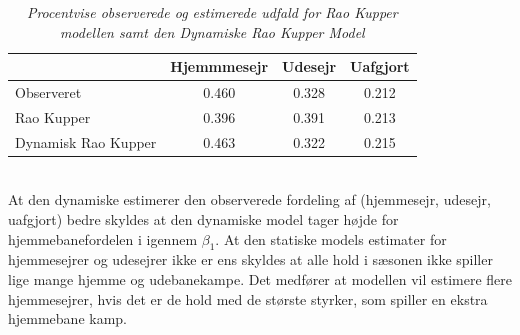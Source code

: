 \documentclass[11pt,a4paper]{article}
\begin{document}
\begin{table}[ht]
\centering
\begin{adjustbox}{max width=\textwidth}
\begin{tabular}{|l|ccc|}
\hline 
 & Hjemmmesejr & Udesejr & Uafgjort \\
 \hline
Observeret & 0.460 & 0.328 & 0.212\\
Rao Kupper & 0.396 & 0.391 & 0.213\\
Dynamisk Rao Kupper & 0.463 & 0.322 & 0.215\\
   \hline   
\end{tabular} 
\end{adjustbox}
\caption{\label{tab:Styrkeestimater}\textit{Procentvise observerede og estimerede udfald for Rao Kupper modellen samt den Dynamiske Rao Kupper Model}}
\end{table}\\
At den dynamiske estimerer den observerede fordeling af (hjemmesejr, udesejr, uafgjort) bedre skyldes at den dynamiske model tager højde for hjemmebanefordelen i igennem $\beta_1$. At den statiske models estimater for hjemmesejrer og udesejrer ikke er ens skyldes at alle hold i sæsonen ikke spiller lige mange hjemme og udebanekampe. Det medfører at modellen vil estimere flere hjemmesejrer, hvis det er de hold med de største styrker, som spiller en ekstra hjemmebane kamp. 
\end{document}
